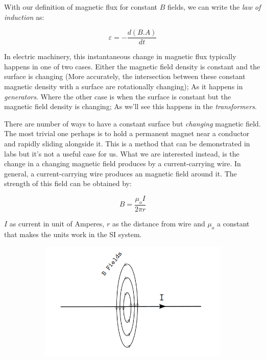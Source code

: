 \documentclass{article}
\begin{document}
	
	With our definition of magnetic flux for constant $B$ fields, we can write the \textit{law of induction} as:

	$$ \varepsilon = -\frac{d(B.A)}{d t} $$
	
	In electric machinery, this instantaneous change in magnetic flux typically happens in one of two cases.
	Either the magnetic field density is constant and the surface is changing (More accurately, the intersection between these constant magnetic density with a surface are rotationally changing); As it happens in \textit{generators}.
	Where the other case is when the surface is constant but the magnetic field density is changing; As we'll see this happens in the \textit{transformers}.

	There are number of ways to have a constant surface but \textit{changing} magnetic field.
	The most trivial one perhaps is to hold a permanent magnet near a conductor and rapidly sliding alongside it.
	This is a method that can be demonstrated in labs but it's not a useful case for us. 
	What we are interested instead, is the change in a changing magnetic field produces by a current-carrying wire. 
	In general, a current-carrying wire produces an magnetic field around it.
	The strength of this field can be obtained by:

	$$ B = \frac{\mu_o I}{2 \pi r} $$
	
	$I$ as current in unit of Amperes, $r$ as the distance from wire and $\mu_o$ a constant that makes the units work in the SI system.

	\begin{figure}[h!]
	\centering
	\begin{subfigure}[b]{0.8\linewidth}
		\includegraphics[width=\linewidth]{magnetic_field_around_a_wire.png}
	\end{subfigure}
	\end{figure}
\end{document}
